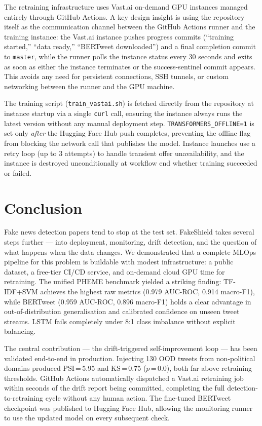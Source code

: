 \documentclass[sigconf]{acmart}
\begin{document}
The retraining infrastructure uses Vast.ai on-demand GPU instances managed entirely through
GitHub Actions. A key design insight is using the repository itself as the communication
channel between the GitHub Actions runner and the training instance: the Vast.ai instance
pushes progress commits (``training started,'' ``data ready,'' ``BERTweet downloaded'') and
a final completion commit to \texttt{master}, while the runner polls the instance status
every 30 seconds and exits as soon as either the instance terminates or the success-sentinel
commit appears. This avoids any need for persistent connections, SSH tunnels, or custom
networking between the runner and the GPU machine.

The training script (\texttt{train\_vastai.sh}) is fetched directly from the repository at
instance startup via a single \texttt{curl} call, ensuring the instance always runs the
latest version without any manual deployment step. \texttt{TRANSFORMERS\_OFFLINE=1} is set
only \textit{after} the Hugging Face Hub push completes, preventing the offline flag from
blocking the network call that publishes the model. Instance launches use a retry loop
(up to 3 attempts) to handle transient offer unavailability, and the instance is destroyed
unconditionally at workflow end whether training succeeded or failed.


\section{Conclusion}

Fake news detection papers tend to stop at the test set. FakeShield takes several steps
further — into deployment, monitoring, drift detection, and the question of what happens when
the data changes. We demonstrated that a complete MLOps pipeline for this problem is buildable
with modest infrastructure: a public dataset, a free-tier CI/CD service, and on-demand cloud
GPU time for retraining. The unified PHEME benchmark yielded a striking finding: TF-IDF+SVM
achieves the highest raw metrics (0.979 AUC-ROC, 0.914 macro-F1), while BERTweet (0.959
AUC-ROC, 0.896 macro-F1) holds a clear advantage in out-of-distribution generalisation
and calibrated confidence on unseen tweet streams. LSTM fails completely under 8:1 class
imbalance without explicit balancing.

The central contribution — the drift-triggered self-improvement loop — has been validated
end-to-end in production. Injecting 130 OOD tweets from non-political domains produced
PSI\,=\,5.95 and KS\,=\,0.75 ($p$\,=\,0.0), both far above retraining thresholds. GitHub
Actions automatically dispatched a Vast.ai retraining job within seconds of the drift report
being committed, completing the full detection-to-retraining cycle without any human action.
The fine-tuned BERTweet checkpoint was published to Hugging Face Hub, allowing the monitoring
runner to use the updated model on every subsequent check.
\end{document}
